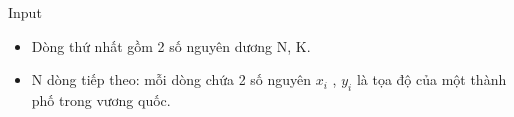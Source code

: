 Input
\begin{itemize}
	\item Dòng thứ nhất gồm 2 số nguyên dương N, K.
	\item N dòng tiếp theo: mỗi dòng chứa 2 số nguyên $x_{i}$ , $y_{i}$ là tọa độ của một thành phố trong vương quốc.
\end{itemize}